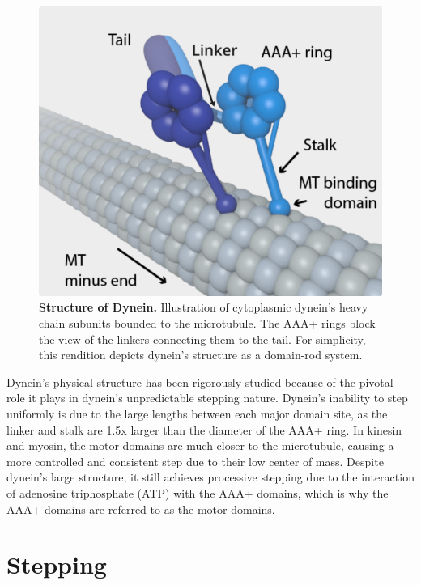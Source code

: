 
\begin{figure}[H]
	\centering
	\includegraphics[width=0.6\columnwidth]{Figures/dynein_on_MT.png}
	\caption[Structure of Dynein]{\textbf{Structure of Dynein.} Illustration of cytoplasmic dynein's heavy chain subunits bounded to the microtubule. The AAA+ rings block the view of the linkers connecting them to the tail. For simplicity, this rendition depicts dynein’s structure as a domain-rod system. \cite{TheTrappistArt}}
	\label{fig:structure}
\end{figure}

Dynein's physical structure has been rigorously studied because of the pivotal role it plays in dynein's unpredictable stepping nature. Dynein's inability to step uniformly is due to the large lengths between each major domain site, as the linker and stalk are 1.5x larger than the diameter of the AAA+ ring. In kinesin and myosin, the motor domains are much closer to the microtubule, causing a more controlled and consistent step due to their low center of mass. Despite dynein's large structure, it still achieves processive stepping due to the interaction of adenosine triphosphate (ATP) with the AAA+ domains, which is why the AAA+ domains are referred to as the motor domains.





\section{Stepping}

